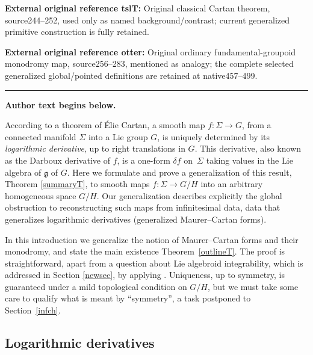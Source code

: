 \documentclass[11pt]{article}
\numberwithin{equation}{section}
\numberwithin{equation}{section}
\begin{document}
\noindent\textbf{External original reference tslT:} Original classical Cartan theorem, source244–252, used only as named background/contrast; current generalized primitive construction is fully retained.\par
\noindent\textbf{External original reference otter:} Original ordinary fundamental-groupoid monodromy map, source256–283, mentioned as analogy; the complete selected generalized global/pointed definitions are retained at native457–499.\par
\medskip\hrule\medskip\noindent\textbf{Author text begins below.}\par
\setcounter{section}{1}
According to a theorem of \'Elie Cartan, a smooth map $f \colon \Sigma \rightarrow G$, from a
connected manifold $\Sigma$ into a Lie group $G$, is uniquely
determined by its {\it logarithmic derivative}, up to right
translations in $G$. This derivative, also known as the Darboux
derivative of $f$, is a one-form $\delta f$ on~$\Sigma $ taking values
in the Lie algebra of ${\mathfrak g} $ of $G$. Here we formulate and
prove a generalization of this result, Theorem \ref{summaryT}, to
smooth maps $f \colon \Sigma \rightarrow G/H$ into an arbitrary
homogeneous space $G/H$. Our generalization describes explicitly the
global obstruction to reconstructing such maps from infinitesimal
data, data that generalizes logarithmic derivatives (generalized
Maurer--Cartan forms).

In this introduction we generalize the notion of Maurer--Cartan forms
and their monodromy, and state the main existence Theorem~\ref{outlineT}. The proof is straightforward, apart from a question
about Lie algebroid integrability, which is addressed in Section
\ref{newsec}, by applying \cite{Crainic_Fernandes_03}. Uniqueness, up
to symmetry, is guaranteed under a mild topological condition on
$G/H$, but we must take some care to qualify what is meant by
``symmetry'', a task postponed to Section~\ref{infch}.

\setcounter{Theorem}{1}\setcounter{equation}{2}
\subsection*{Logarithmic derivatives}
\end{document}
